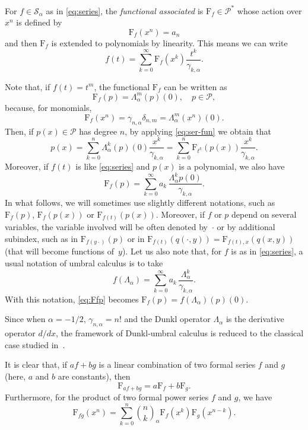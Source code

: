 \documentclass[11pt]{article}
\theoremstyle{plain}
\theoremstyle{remark}
\numberwithin{equation}{section} %
\newcommand{\La}{\Lambda_{\alpha}}
\newcommand{\binoma}[2]{\binom{#1}{#2}_{\!\alpha}}
\newcommand{\calP}{\mathcal{P}}
\newcommand{\Sa}{\mathcal{S}_{\alpha}}
\newcommand{\FF}{\mathrm{F}}
\begin{document}
For $f \in \Sa$ as in \eqref{eq:series}, the \textit{functional associated} is $\FF_f \in \calP^*$ whose action over $x^n$ is defined by 
\begin{equation}
\label{eq:ev-xn}
\FF_f(x^n) = a_n
\end{equation}
and then $\FF_f$ is extended to polynomials by linearity.
This means we can write 
\begin{equation}
\label{eq:ser-fun}
f(t) = \sum_{k=0}^{\infty} \FF_{f}(x^k) \frac{t^k}{\gamma_{k,\alpha}}.
\end{equation}

Note that, if $f(t) = t^m$, the functional  $\FF_f$ can be written as 
\[
  \FF_f(p) = \La^m(p)(0), \quad p \in \calP,
\]
because, for monomials,
\[
\FF_f(x^n) = \gamma_{n,\alpha}\delta_{n,m} = \La^m(x^n)(0).
\]
Then, if $p(x) \in \calP$ has degree $n$, by applying \eqref{eq:ser-fun} we obtain that
\begin{equation}
\label{eq:pol}
p(x) = \sum_{k=0}^n \La^k(p)(0) \frac{x^k}{\gamma_{k,\alpha}} 
= \sum_{k=0}^n \FF_{t^k}(p(x)) \frac{x^k}{\gamma_{k,\alpha}}.
\end{equation}
Moreover, if $f(t)$ is like \eqref{eq:series} and $p(x)$ is a polynomial, we also have
\begin{equation}
\label{eq:Ffp}
\FF_f(p) = \sum_{k=0}^{\infty} {a_k} \,\frac{\La^k p(0)}{\gamma_{k,\alpha}}.
\end{equation}
In what follows, we will sometimes use slightly different notations, such as $\FF_f(p)$, $\FF_f(p(x))$ or $\FF_{f(t)}(p(x))$. Moreover, if $f$ or $p$ depend on several variables, the variable involved will be often denoted by~$\cdot$ or by additional subindex, such as in $\FF_{f(y\cdot)}(p)$ or in $\FF_{f(t)}(q(\cdot,y)) = \FF_{f(t),x}(q(x,y))$ (that will become functions of~$y$). Let us also note that, for $f$ is as in \eqref{eq:series}, a usual notation of umbral calculus is to take
\begin{equation}
\label{eq:fLa}
f(\La) = \sum_{k=0}^{\infty} {a_k} \, \frac{\La^k}{\gamma_{k,\alpha}}.
\end{equation}
With this notation, \eqref{eq:Ffp} becomes $\FF_f(p) = f(\La)(p)(0)$.


Since when $\alpha = -1/2$, $\gamma_{n,\alpha} = n!$ and the Dunkl operator $\La$ is the derivative operator $d/dx$, the framework of Dunkl-umbral calculus is reduced to the classical case studied in~\cite{Rom}.

It is clear that, if $af+bg$ is a linear combination of two formal series $f$ and $g$ (here, $a$ and $b$ are constants), then
\begin{equation}
\label{eq:af+bg}
\FF_{af+bg} = a\FF_{f}+b\FF_{g}.
\end{equation}
Furthermore, for the product of two formal power series $f$ and $g$, we have
\[
\FF_{fg}(x^n) = \sum_{k=0}^n \binoma{n}{k} \FF_f(x^k) \FF_g(x^{n-k}).
\]
\end{document}
